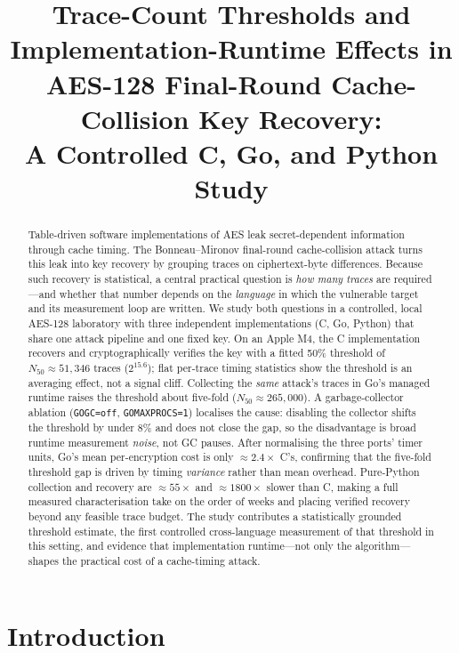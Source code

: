 \documentclass[11pt]{article}
\title{\bfseries Trace-Count Thresholds and Implementation-Runtime Effects in
AES-128 Final-Round Cache-Collision Key Recovery:\\
A Controlled C, Go, and Python Study}
\author{}
\date{}
\begin{document}
\maketitle

\begin{abstract}
\noindent
Table-driven software implementations of AES leak secret-dependent information
through cache timing. The Bonneau--Mironov final-round cache-collision attack
turns this leak into key recovery by grouping traces on ciphertext-byte
differences. Because such recovery is statistical, a central practical question
is \emph{how many traces} are required---and whether that number depends on the
\emph{language} in which the vulnerable target and its measurement loop are
written. We study both questions in a controlled, local AES-128 laboratory with
three independent implementations (C, Go, Python) that share one attack pipeline
and one fixed key. On an Apple M4, the C implementation recovers and
cryptographically verifies the key with a fitted 50\% threshold of
$N_{50}\approx 51{,}346$ traces ($2^{15.6}$); flat per-trace timing statistics
show the threshold is an averaging effect, not a signal cliff. Collecting the
\emph{same} attack's traces in Go's managed runtime raises the threshold about
five-fold ($N_{50}\approx 265{,}000$). A garbage-collector ablation
(\texttt{GOGC=off}, \texttt{GOMAXPROCS=1}) localises the cause: disabling the
collector shifts the threshold by under 8\% and does not close the gap, so the
disadvantage is broad runtime measurement \emph{noise}, not GC pauses. After
normalising the three ports' timer units, Go's mean per-encryption cost is only
$\approx 2.4\times$ C's, confirming that the five-fold threshold gap is driven by
timing \emph{variance} rather than mean overhead. Pure-Python collection and
recovery are $\approx 55\times$ and $\approx 1800\times$ slower than C, making a
full measured characterisation take on the order of weeks and placing verified
recovery beyond any feasible trace budget. The study contributes a
statistically grounded threshold estimate, the first controlled cross-language
measurement of that threshold in this setting, and evidence that implementation
runtime---not only the algorithm---shapes the practical cost of a cache-timing
attack.
\end{abstract}

\section{Introduction}
\label{sec:intro}
\end{document}
